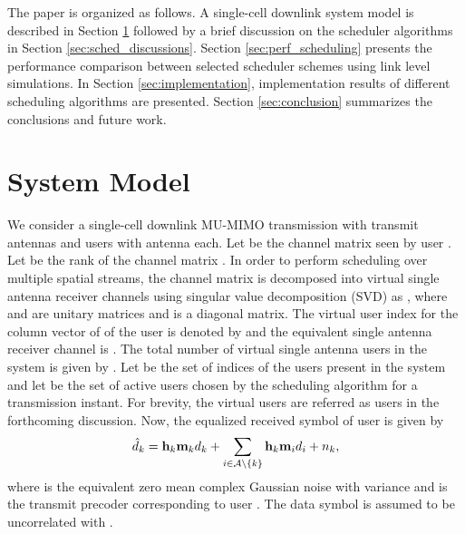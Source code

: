 \documentclass[conference,letterpaper,10pt]{./../../IEEE/IEEEtran}
\begin{document}
The paper is organized as follows. A single-cell downlink system model is described in Section \ref{sec:system_model} followed by a brief discussion on the scheduler algorithms in Section \ref{sec:sched_discussions}. Section \ref{sec:perf_scheduling} presents the performance comparison between selected scheduler schemes using link level simulations. In Section \ref{sec:implementation}, implementation results of different scheduling algorithms are presented. Section \ref{sec:conclusion} summarizes the conclusions and future work.

\section{System Model}
\label{sec:system_model}
We consider a single-cell downlink MU-MIMO transmission with  transmit antennas and  users with  antenna each. Let  be the channel matrix seen by user . Let  be the rank of the channel matrix . In order to perform scheduling over multiple spatial streams, the channel matrix  is decomposed into  virtual single antenna receiver channels using singular value decomposition (SVD) as , where  and  are unitary matrices and  is a diagonal matrix. 
The virtual user index for the  column vector of  of the  user is denoted by  and the equivalent single antenna receiver channel is . The total number of virtual single antenna users in the system is given by . Let  be the set of indices of the users present in the system and let  be the set of active users chosen by the scheduling algorithm for a transmission instant. For brevity, the virtual users are referred as users in the forthcoming discussion. Now, the equalized received symbol  of user  is given by
\begin{equation}
\hat{d}_k = \mathbf{h}_{k} \mathbf{m}_{k} d_k + \sum_{i \in \mathcal{A} \backslash \{k\}} \mathbf{h}_{k} \mathbf{m}_{i} d_i + {n}_{k},
\end{equation}
where  is the equivalent zero mean complex Gaussian noise with variance  and  is the transmit precoder corresponding to user . The data symbol  is assumed to be uncorrelated with .
\end{document}
